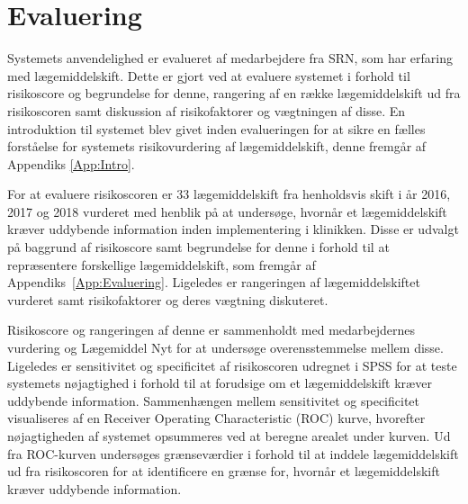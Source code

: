 \section{Evaluering}
Systemets anvendelighed er evalueret af medarbejdere fra SRN, som har erfaring med lægemiddelskift. Dette er gjort ved at evaluere systemet i forhold til risikoscore og begrundelse for denne, rangering af en række lægemiddelskift ud fra risikoscoren samt diskussion af risikofaktorer og vægtningen af disse. En introduktion til systemet blev givet inden evalueringen for at sikre en fælles forståelse for systemets risikovurdering af lægemiddelskift, denne fremgår af Appendiks \ref{App:Intro}. 

For at evaluere risikoscoren er 33 lægemiddelskift fra henholdsvis skift i år 2016, 2017 og 2018 vurderet med henblik på at undersøge, hvornår et lægemiddelskift kræver uddybende information inden implementering i klinikken. Disse er udvalgt på baggrund af risikoscore samt begrundelse for denne i forhold til at repræsentere forskellige lægemiddelskift, som fremgår af Appendiks~\ref{App:Evaluering}. Ligeledes er rangeringen af lægemiddelskiftet vurderet samt risikofaktorer og deres vægtning diskuteret. 

Risikoscore og rangeringen af denne er sammenholdt med medarbejdernes vurdering og Lægemiddel Nyt for at undersøge overensstemmelse mellem disse. Ligeledes er sensitivitet og specificitet af risikoscoren udregnet i SPSS for at teste systemets nøjagtighed i forhold til at forudsige om et lægemiddelskift kræver uddybende information. Sammenhængen mellem sensitivitet og specificitet visualiseres af en Receiver Operating Characteristic (ROC) kurve, hvorefter nøjagtigheden af systemet opsummeres ved at beregne arealet under kurven. Ud fra ROC-kurven undersøges grænseværdier i forhold til at inddele lægemiddelskift ud fra risikoscoren for at identificere en grænse for, hvornår et lægemiddelskift kræver uddybende information.



